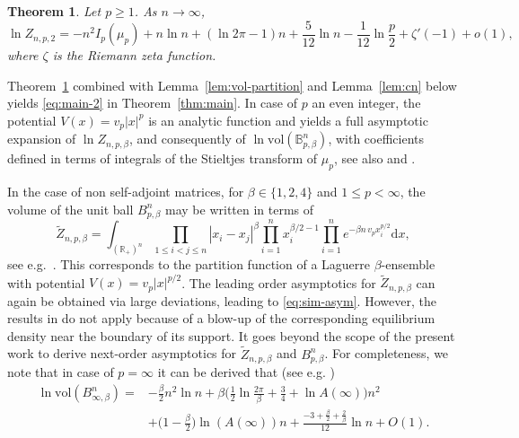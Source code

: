 \documentclass[a4paper,12pt,reqno]{amsart}
\newtheorem{theorem}{Theorem}
\theoremstyle{definition}
\newcommand{\IR}{\mathbb{R}}
\newcommand{\vol}{\mathrm{vol}}
\newcommand{\dd}{\mathrm{d}}
\newcommand{\bpb}{\mathbb{B}_{p,\beta}^n}
\begin{document}
\begin{theorem} \label{thm:CKM}
Let $p\ge 1$. As $n\to\infty$,
\[
\ln Z_{n,p,2}
=-n^2 I_p(\mu_p)+n\ln n+(\ln 2\pi -1) n +\frac{5}{12}\ln n -\frac{1}{12}\ln \frac{p}{2}+\zeta'(-1)+o(1),
\]
where $\zeta$ is the Riemann zeta function. 
\end{theorem}

Theorem~\ref{thm:CKM} combined with Lemma~\ref{lem:vol-partition} and Lemma~\ref{lem:cn} below yields \eqref{eq:main-2} in Theorem~\ref{thm:main}. In case of $p$ an even integer, the potential $V(x)=v_p |x|^p$ is an analytic function and \cite[Prop.~1.2]{BG13} yields a full asymptotic expansion of $\ln Z_{n,p,\beta}$, and consequently of $\ln \vol(\bpb)$, with coefficients defined in terms of integrals of the Stieltjes transform of $\mu_p$, see also \cite[Sec.~7]{BG24} and \cite{Shc13,Shc14}. 

In the case of non self-adjoint matrices, for $\beta\in\{1,2,4\}$ and $1\le p<\infty$, the volume of the unit ball $B_{p,\beta}^n$ may be written in terms of 
\[
\tilde{Z}_{n,p,\beta}
=\int_{(\IR_+)^n}\prod_{1\le i<j\le n}|x_i-x_j|^{\beta}\prod_{i=1}^n x_i^{\beta/2-1}\prod_{i=1}^n e^{-\beta n\, v_px_i^{p/2}}\dd x,
\]
see e.g.~\cite[Sec.~4.2]{DFG+23}. This corresponds to the partition function of a Laguerre $\beta$-ensemble with potential $V(x)=v_p|x|^{p/2}$. The leading order asymptotics for $\tilde{Z}_{n,p,\beta}$ can again be obtained via large deviations, leading to \eqref{eq:sim-asym}. However, the results in \cite{LS17} do not apply because of a blow-up of the corresponding equilibrium density near the boundary of its support.  It goes beyond the scope of the present work to derive next-order asymptotics for $\tilde{Z}_{n,p,\beta}$ and $B_{p,\beta}^n$. For completeness, we note that in case of $p=\infty$ it can be derived that (see e.g. \cite{JKP24})
\begin{align*}
\ln \vol(B_{\infty,\beta}^n)
=&-\frac{\beta}{2}n^2\ln n +\beta\Big(\frac{1}{2}\ln\frac{2\pi}{\beta}+\frac{3}{4}+\ln A(\infty)\Big)n^2\\
&+\Big(1-\frac{\beta}{2}\Big)\ln(A(\infty))n
+\frac{-3+\frac{\beta}{2}+\frac{2}{\beta}}{12}\ln n
+O(1).
\end{align*}
\end{document}

